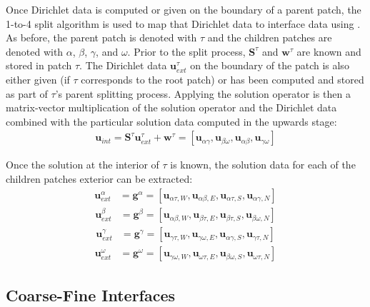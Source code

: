 Once Dirichlet data is computed or given on the boundary of a parent patch, the 1-to-4 split algorithm is used to map that Dirichlet data to interface data using \Stau. As before, the parent patch is denoted with $\tau$ and the children patches are denoted with $\alpha$, $\beta$, $\gamma$, and $\omega$. Prior to the split process, $\textbf{S}^{\tau}$ and $\textbf{w}^{\tau}$ are known and stored in patch $\tau$. The Dirichlet data $\textbf{u}^{\tau}_{ext}$ on the boundary of the patch is also either given (if $\tau$ corresponds to the root patch) or has been computed and stored as part of $\tau$'s parent splitting process. Applying the solution operator is then a matrix-vector multiplication of the solution operator and the Dirichlet data combined with the particular solution data computed in the upwards stage:
\begin{align}
    \textbf{u}_{int} = \textbf{S}^{\tau} \textbf{u}^{\tau}_{ext} + \textbf{w}^{\tau} = [\textbf{u}_{\alpha \gamma}, \textbf{u}_{\beta \omega}, \textbf{u}_{\alpha \beta}, \textbf{u}_{\gamma \omega}]
    \label{eq:S-times-u_ext}
\end{align}

Once the solution at the interior of $\tau$ is known, the solution data for each of the children patches exterior can be extracted:
\begin{align}
    \textbf{u}^{\alpha}_{ext} &= \textbf{g}^{\alpha} = [\textbf{u}_{\alpha \tau, W}, \textbf{u}_{\alpha \beta, E}, \textbf{u}_{\alpha \tau, S}, \textbf{u}_{\alpha \gamma, N}]
    \label{eq:u_ext_alpha}
\end{align}
\begin{align}
    \textbf{u}^{\beta}_{ext} &= \textbf{g}^{\beta} = [\textbf{u}_{\alpha \beta, W}, \textbf{u}_{\beta \tau, E}, \textbf{u}_{\beta \tau, S}, \textbf{u}_{\beta \omega, N}]
    \label{eq:u_ext_beta}
\end{align}
\begin{align}
    \textbf{u}^{\gamma}_{ext} &= \textbf{g}^{\gamma} = [\textbf{u}_{\gamma \tau, W}, \textbf{u}_{\gamma \omega, E}, \textbf{u}_{\alpha \gamma, S}, \textbf{u}_{\gamma \tau, N}]
    \label{eq:u_ext_gamma}
\end{align}
\begin{align}
    \textbf{u}^{\omega}_{ext} &= \textbf{g}^{\omega} = [\textbf{u}_{\gamma \omega, W}, \textbf{u}_{\omega \tau, E}, \textbf{u}_{\beta \omega, S}, \textbf{u}_{\omega \tau, N}]
    \label{eq:u_ext_omega}
\end{align}

\subsection{Coarse-Fine Interfaces}
\label{sub:mesh_adaptivity}

